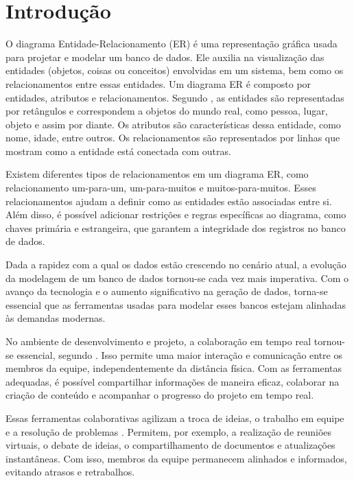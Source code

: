 %
%
\chapter{Introdução}

O diagrama Entidade-Relacionamento (ER) é uma representação gráfica usada para projetar e modelar um banco de dados. Ele auxilia na visualização das entidades (objetos, coisas ou conceitos) envolvidas em um sistema, bem como os relacionamentos entre essas entidades. 
Um diagrama ER é composto por entidades, atributos e relacionamentos. Segundo \cite{Fundamentos2017}, as entidades são representadas por retângulos e correspondem a objetos do mundo real, como pessoa, lugar, objeto e assim por diante. Os atributos são características dessa entidade, como nome, idade, entre outros. Os relacionamentos são representados por linhas que mostram como a entidade está conectada com outras.

Existem diferentes tipos de relacionamentos em um diagrama ER, como relacionamento um-para-um, um-para-muitos e muitos-para-muitos. Esses relacionamentos ajudam a definir como as entidades estão associadas entre si.
Além disso, é possível adicionar restrições e regras específicas ao diagrama, como chaves primária e estrangeira, que garantem a integridade dos registros no banco de dados.

Dada a rapidez com a qual os dados estão crescendo no cenário atual, a evolução da modelagem de um banco de dados tornou-se cada vez mais imperativa. Com o avanço da tecnologia e o aumento significativo na geração de dados, torna-se essencial que as ferramentas usadas para modelar esses bancos estejam alinhadas às demandas modernas.

No ambiente de desenvolvimento e projeto, a colaboração em tempo real tornou-se essencial, segundo \cite{Hsu2021}. Isso permite uma maior interação e comunicação entre os membros da equipe, independentemente da distância física. Com as ferramentas adequadas, é possível compartilhar informações de maneira eficaz, colaborar na criação de conteúdo e acompanhar o progresso do projeto em tempo real.

Essas ferramentas colaborativas agilizam a troca de ideias, o trabalho em equipe e a resolução de problemas \cite{Inoue2014}. Permitem, por exemplo, a realização de reuniões virtuais, o debate de ideias, o compartilhamento de documentos e atualizações instantâneas. Com isso, membros da equipe permanecem alinhados e informados, evitando atrasos e retrabalhos.


